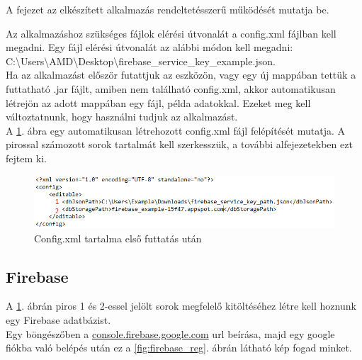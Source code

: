 
A fejezet az elkészített alkalmazás rendeltetésszerű működését mutatja be.

Az alkalmazáshoz szükséges fájlok elérési útvonalát a config.xml fájlban kell megadni.
Egy fájl elérési útvonalát az alábbi módon kell megadni: \\C:\textbackslash Users\textbackslash AMD\textbackslash Desktop\textbackslash firebase\_service\_key\_example.json.
\vspace{5pt}\\Ha az alkalmazást először futattjuk az eszközön, vagy egy új mappában tettük a futtatható .jar fájlt, amiben nem található config.xml, akkor automatikusan létrejön az adott mappában egy fájl, példa adatokkal. Ezeket meg kell változtatnunk, hogy használni tudjuk az alkalmazást.
\vspace{15pt}\\A \ref{fig:config_file}. ábra egy automatikusan létrehozott config.xml fájl felépítését mutatja. A pirossal számozott sorok tartalmát kell szerkesszük, a további alfejezetekben ezt fejtem ki.
\begin{figure}[h]
	\centering
	\includegraphics[scale=0.5]{images/config_1.png}
	\caption{Config.xml tartalma első futtatás után}
	\label{fig:config_file}
\end{figure}

\subsection{Firebase}
A \ref{fig:config_file}. ábrán piros 1 és 2-essel jelölt sorok megfelelő kitöltéséhez létre kell hoznunk egy Firebase adatbázist. 
\vspace{5pt}\\Egy böngészőben a \href{https://console.firebase.google.com/u/0/}{console.firebase.google.com} url beírása, majd egy google fiókba való belépés után ez a \ref{fig:firebase_reg}. ábrán látható kép fogad minket.

